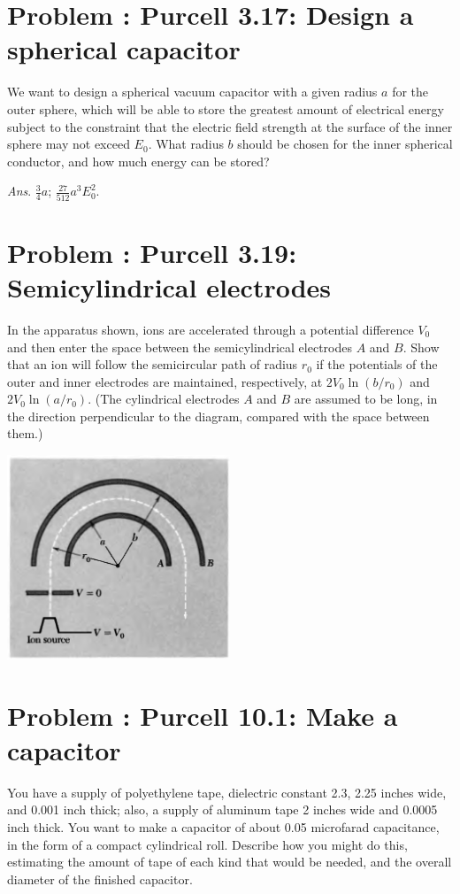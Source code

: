 \documentclass[problems]{esg8022pset}
\begin{document}
\section{Problem \thesection: Purcell 3.17: Design a spherical capacitor}
  We want to design a spherical vacuum capacitor with a given
  radius $a$ for the outer sphere, which will be able to store the greatest
  amount of electrical energy subject to the constraint that the electric
  field strength at the surface of the inner sphere may not exceed $E_0$.
  What radius $b$ should be chosen for the inner spherical conductor, and
  how much energy can be stored?

  \begin{flushright}\emph{Ans}. $\frac34 a$; $\frac{27}{512} a^3 E_0^2$.\end{flushright}
\section{Problem \thesection: Purcell 3.19: Semicylindrical electrodes}
  In the apparatus shown, ions are accelerated through a potential difference $V_0$ and then enter the space between the semicylindrical electrodes $A$ and $B$. Show that an ion will follow the semicircular path of radius $r_0$ if the potentials of the outer and inner electrodes are maintained, respectively, at $2V_0\ln(b/r_0)$ and $2V_0\ln(a/r_0)$. (The cylindrical electrodes $A$ and $B$ are assumed to be long, in the direction perpendicular to the diagram, compared with the space between them.)
  \begin{center}\includegraphics[width=0.5\textwidth]{ps04_06}\end{center}
\section{Problem \thesection: Purcell 10.1: Make a capacitor}
  You have a supply of polyethylene tape, dielectric constant
  2.3, 2.25 inches wide, and 0.001 inch thick; also, a supply of aluminum
  tape 2 inches wide and 0.0005 inch thick. You want to make a capacitor
  of about 0.05 microfarad capacitance, in the form of a compact
  cylindrical roll. Describe how you might do this, estimating the
  amount of tape of each kind that would be needed, and the overall
  diameter of the finished capacitor.
\end{document}
